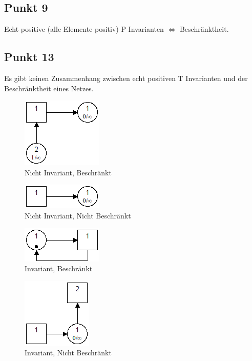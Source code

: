 \documentclass[10pt]{scrartcl}
\begin{document}
				
				\subsection{Punkt 9}
				Echt positive (alle Elemente positiv) P Invarianten $\Longleftrightarrow$ Beschränktheit.
				
				 \subsection{Punkt 13}
				 Es gibt keinen Zusammenhang zwischen echt positiven T Invarianten und der Beschränktheit eines Netzes.
				 \begin{figure}[H]
    				\centering	
					\includegraphics[scale=0.5]{aufg0131.png}		
            		\caption{Nicht Invariant, Beschränkt}
				\end{figure}
				\begin{figure}[H]
    				\centering	
					\includegraphics[scale=0.5]{aufg0132.png}		
            		\caption{Nicht Invariant, Nicht Beschränkt}
				\end{figure}
				\begin{figure}[H]
    				\centering	
					\includegraphics[scale=0.5]{aufg0133.png}		
            		\caption{Invariant, Beschränkt}
				\end{figure}
				\begin{figure}[H]
    				\centering	
					\includegraphics[scale=0.5]{aufg0134.png}		
            		\caption{Invariant, Nicht Beschränkt}
				\end{figure}
				 
\end{document}
